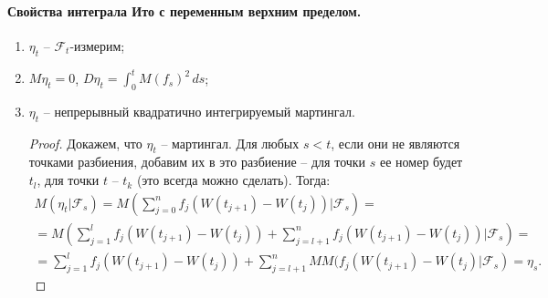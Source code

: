 \paragraph{Свойства интеграла Ито с переменным верхним пределом.}
\begin{enumerate}
  \item $\eta_t$ -- $\mathcal{F}_t$-измерим;
  \item $M\eta_t = 0$, $D\eta_t = \int_0^t M(f_s)^2 \, ds$;
  \item $\eta_t$ -- непрерывный квадратично интегрируемый мартингал.
    \begin{proof}
      Докажем, что $\eta_t$ -- мартингал. Для любых $s<t$, если они не являются точками разбиения,
      добавим их в это разбиение -- для точки $s$ ее номер будет $t_l$, для точки $t$ -- $t_k$
      (это всегда можно сделать). Тогда:
      \begin{multline*}
        M(\eta_t | \mathcal{F}_s) =
        M \left( \sum_{j=0}^n f_j (W(t_{j+1})-W(t_j)) | \mathcal{F}_s \right) = \\
        = M \left( \sum_{j=1}^l f_j (W(t_{j+1})-W(t_j)) + \sum_{j=l+1}^n f_j (W(t_{j+1})-W(t_j)) | \mathcal{F}_s \right) = \\
        = \sum_{j=1}^l f_j \left( W(t_{j+1})-W(t_j) \right) + \sum_{j=l+1}^n MM(f_j (W(t_{j+1})-W(t_j) | \mathcal{F}_s) = \eta_s.
      \end{multline*}
    \end{proof}
\end{enumerate}

